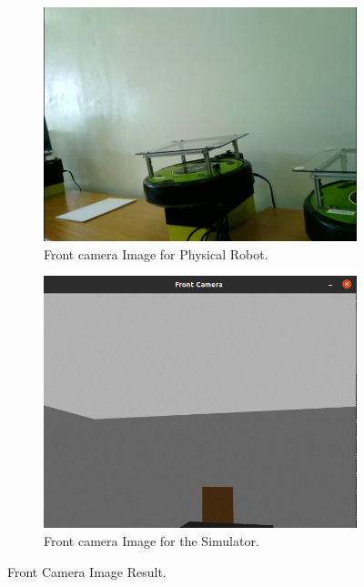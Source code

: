 \documentclass{CSSRforAfrica}
\begin{document}
\begin{figure}[ht]{}
	\centering
	\begin{subfigure}[b]{0.45\linewidth}
		\includegraphics[width=\linewidth]{images/frontCamera.png}
		\caption{Front camera Image for Physical Robot.}
		\label{fig:Physical Front Camera Image}
	\end{subfigure}
	\hfill
	\begin{subfigure}[b]{0.45\linewidth}
		\includegraphics[width=\linewidth]{images/frontCameraSimulator.png}
		\caption{Front camera Image for the Simulator.}
		\label{fig:Simulator Front camera Image}
	\end{subfigure}
	\caption{Front Camera Image Result.}
	\label{fig:Front camera test}
\end{figure}
\end{document}
